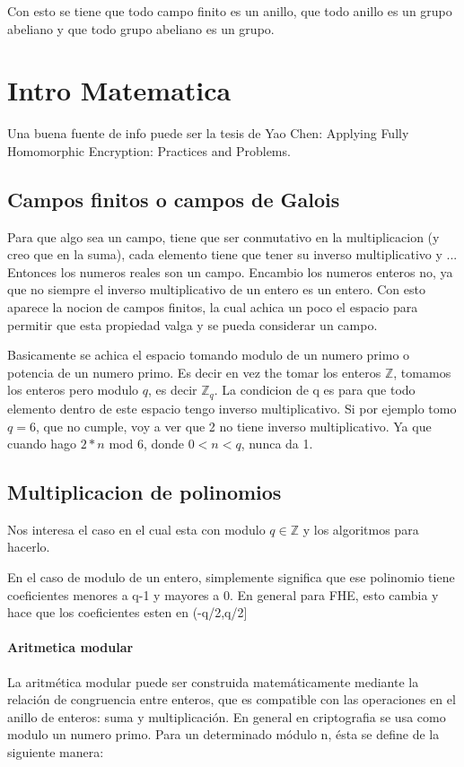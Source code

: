 \documentclass[12pt, oneside]{article}
\newcommand{\Z}{\mathbb{Z}}
\begin{document}
Con esto se tiene que todo campo finito es un anillo, que todo anillo es un grupo abeliano y que todo grupo abeliano es un grupo.
\section{Intro Matematica}
Una buena fuente de info puede ser la tesis de Yao Chen: Applying Fully Homomorphic
Encryption: Practices and Problems.

\subsection{Campos finitos o campos de Galois}
Para que algo sea un campo, tiene que ser conmutativo en la multiplicacion (y creo que en la suma),
cada elemento tiene que tener su inverso multiplicativo y ...
Entonces los numeros reales son un campo.
Encambio los numeros enteros no, ya que no siempre el inverso multiplicativo de un entero
es un entero.
Con esto aparece la nocion de campos finitos, la cual achica un poco el espacio para
permitir que esta propiedad valga y se pueda considerar un campo.

Basicamente se achica el espacio tomando modulo de un numero primo o potencia de un
numero primo.
Es decir en vez the tomar los enteros $\Z$, tomamos los enteros pero modulo $q$,
es decir $\Z_q$.
La condicion de q es para que todo elemento dentro de este espacio tengo inverso multiplicativo.
Si por ejemplo tomo $q=6$, que no cumple, voy a ver que 2 no tiene inverso multiplicativo.
Ya que cuando hago $2*n$ mod 6, donde $0 < n < q$, nunca da 1.

\subsection{Multiplicacion de polinomios}
Nos interesa el caso en el cual esta con modulo $q \in \Z$ y los algoritmos para hacerlo.

En el caso de modulo de un entero, simplemente significa que ese polinomio tiene coeficientes
menores a q-1 y mayores a 0.
En general para FHE, esto cambia y hace que los coeficientes esten en (-q/2,q/2]

\paragraph{Aritmetica modular}
La aritmética modular puede ser construida matemáticamente mediante la relación de
congruencia entre enteros, que es compatible con las operaciones en el anillo de enteros:
suma y multiplicación.
En general en criptografia se usa como modulo un numero primo.
Para un determinado módulo n, ésta se define de la siguiente manera:
\end{document}

